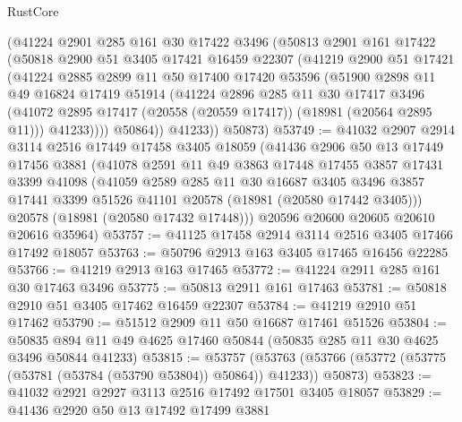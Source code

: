 \begin{lexlean}{RustCore}
\begin{coremodule}
        (@41224
          @2901
          @285
          @161
          @30
          @17422
          @3496
          (@50813
            @2901
            @161
            @17422
            (@50818
              @2900
              @51
              @3405
              @17421
              @16459
              @22307
              (@41219
                @2900
                @51
                @17421
                (@41224
                  @2885
                  @2899
                  @11
                  @50
                  @17400
                  @17420
                  @53596
                  (@51900
                    @2898
                    @11
                    @49
                    @16824
                    @17419
                    @51914
                    (@41224
                      @2896
                      @285
                      @11
                      @30
                      @17417
                      @3496
                      (@41072 @2895 @17417 (@20558 (@20559 @17417)) (@18981 (@20564 @2895 @11)))
                      @41233))))
              @50864))
          @41233))
      @50873)
@53749 := @41032
    @2907
    @2914
    @3114
    @2516
    @17449
    @17458
    @3405
    @18059
    (@41436
      @2906
      @50
      @13
      @17449
      @17456
      @3881
      (@41078
        @2591
        @11
        @49
        @3863
        @17448
        @17455
        @3857
        @17431
        @3399
        @41098
        (@41059
          @2589
          @285
          @11
          @30
          @16687
          @3405
          @3496
          @3857
          @17441
          @3399
          @51526
          @41101
          @20578
          (@18981 (@20580 @17442 @3405)))
        @20578
        (@18981 (@20580 @17432 @17448)))
      @20596
      @20600
      @20605
      @20610
      @20616
      @35964)
@53757 := @41125 @17458 @2914 @3114 @2516 @3405 @17466 @17492 @18057
@53763 := @50796 @2913 @163 @3405 @17465 @16456 @22285
@53766 := @41219 @2913 @163 @17465
@53772 := @41224 @2911 @285 @161 @30 @17463 @3496
@53775 := @50813 @2911 @161 @17463
@53781 := @50818 @2910 @51 @3405 @17462 @16459 @22307
@53784 := @41219 @2910 @51 @17462
@53790 := @51512 @2909 @11 @50 @16687 @17461 @51526
@53804 := @50835 @894 @11 @49 @4625 @17460 @50844 (@50835 @285 @11 @30 @4625 @3496 @50844 @41233)
@53815 := @53757
    (@53763 (@53766 (@53772 (@53775 (@53781 (@53784 (@53790 @53804)) @50864)) @41233)) @50873)
@53823 := @41032 @2921 @2927 @3113 @2516 @17492 @17501 @3405 @18057
@53829 := @41436 @2920 @50 @13 @17492 @17499 @3881

\end{coremodule}
\end{lexlean}
